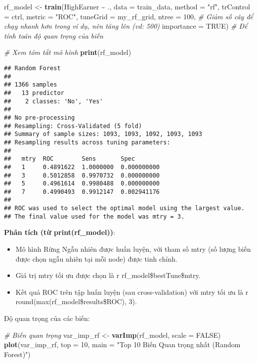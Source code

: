 \documentclass[
]{article}
\newenvironment{Shaded}{\begin{snugshade}}{\end{snugshade}}
\newcommand{\AttributeTok}[1]{\textcolor[rgb]{0.13,0.29,0.53}{#1}}
\newcommand{\CommentTok}[1]{\textcolor[rgb]{0.56,0.35,0.01}{\textit{#1}}}
\newcommand{\ConstantTok}[1]{\textcolor[rgb]{0.56,0.35,0.01}{#1}}
\newcommand{\DecValTok}[1]{\textcolor[rgb]{0.00,0.00,0.81}{#1}}
\newcommand{\FunctionTok}[1]{\textcolor[rgb]{0.13,0.29,0.53}{\textbf{#1}}}
\newcommand{\NormalTok}[1]{#1}
\newcommand{\OtherTok}[1]{\textcolor[rgb]{0.56,0.35,0.01}{#1}}
\newcommand{\SpecialCharTok}[1]{\textcolor[rgb]{0.81,0.36,0.00}{\textbf{#1}}}
\newcommand{\StringTok}[1]{\textcolor[rgb]{0.31,0.60,0.02}{#1}}
\begin{document}
\begin{Shaded}
\begin{Highlighting}[]
\NormalTok{rf\_model }\OtherTok{\textless{}{-}} \FunctionTok{train}\NormalTok{(HighEarner }\SpecialCharTok{\textasciitilde{}}\NormalTok{ ., }
                  \AttributeTok{data =}\NormalTok{ train\_data, }
                  \AttributeTok{method =} \StringTok{"rf"}\NormalTok{, }
                  \AttributeTok{trControl =}\NormalTok{ ctrl,}
                  \AttributeTok{metric =} \StringTok{"ROC"}\NormalTok{,}
                  \AttributeTok{tuneGrid =}\NormalTok{ my\_rf\_grid, }
                  \AttributeTok{ntree =} \DecValTok{100}\NormalTok{, }\CommentTok{\# Giảm số cây để chạy nhanh hơn trong ví dụ, nên tăng lên (vd: 500)}
                  \AttributeTok{importance =} \ConstantTok{TRUE}\NormalTok{) }\CommentTok{\# Để tính toán độ quan trọng của biến}

\CommentTok{\# Xem tóm tắt mô hình}
\FunctionTok{print}\NormalTok{(rf\_model)}
\end{Highlighting}
\end{Shaded}

\begin{verbatim}
## Random Forest 
## 
## 1366 samples
##   13 predictor
##    2 classes: 'No', 'Yes' 
## 
## No pre-processing
## Resampling: Cross-Validated (5 fold) 
## Summary of sample sizes: 1093, 1093, 1092, 1093, 1093 
## Resampling results across tuning parameters:
## 
##   mtry  ROC        Sens       Spec       
##   1     0.4891622  1.0000000  0.000000000
##   3     0.5012858  0.9970732  0.000000000
##   5     0.4961614  0.9980488  0.000000000
##   7     0.4990493  0.9912147  0.002941176
## 
## ROC was used to select the optimal model using the largest value.
## The final value used for the model was mtry = 3.
\end{verbatim}

\textbf{Phân tích (từ print(rf\_model))}:

\begin{itemize}
\item
  Mô hình Rừng Ngẫu nhiên được huấn luyện, với tham số mtry (số lượng
  biến được chọn ngẫu nhiên tại mỗi node) được tinh chỉnh.
\item
  Giá trị mtry tối ưu được chọn là r rf\_model\$bestTune\$mtry.
\item
  Kết quả ROC trên tập huấn luyện (sau cross-validation) với mtry tối ưu
  là r round(max(rf\_model\$results\$ROC), 3).
\end{itemize}

Độ quan trọng của các biến:

\begin{Shaded}
\begin{Highlighting}[]
\CommentTok{\# Biến quan trọng}
\NormalTok{var\_imp\_rf }\OtherTok{\textless{}{-}} \FunctionTok{varImp}\NormalTok{(rf\_model, }\AttributeTok{scale =} \ConstantTok{FALSE}\NormalTok{)}
\FunctionTok{plot}\NormalTok{(var\_imp\_rf, }\AttributeTok{top =} \DecValTok{10}\NormalTok{, }\AttributeTok{main =} \StringTok{"Top 10 Biến Quan trọng nhất (Random Forest)"}\NormalTok{)}
\end{Highlighting}
\end{Shaded}
\end{document}
